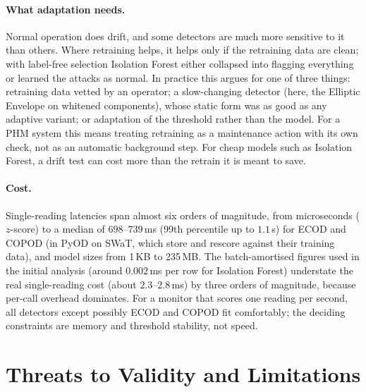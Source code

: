 \documentclass[11pt]{article}
\begin{document}
\paragraph{What adaptation needs.} Normal operation does drift, and some
detectors are much more sensitive to it than others. Where retraining helps, it
helps only if the retraining data are clean; with label-free selection Isolation
Forest either collapsed into flagging everything or learned the attacks as
normal. In practice this argues for one of three things: retraining data vetted
by an operator; a slow-changing detector (here, the Elliptic Envelope on whitened
components), whose static form was as good as any adaptive variant; or adaptation
of the threshold rather than the model. For a PHM system this means treating retraining
as a maintenance action with its own check, not as an automatic background step. For cheap models such as Isolation Forest, a
drift test can cost more than the retrain it is meant to save.

\paragraph{Cost.} Single-reading latencies span almost six orders of magnitude, from
microseconds ($z$-score) to a median of $698$--$739$\,ms (99th percentile up to $1.1$\,s) for
ECOD and COPOD (in PyOD on SWaT, which store and
rescore against their training data), and model sizes from 1\,KB to 235\,MB. The
batch-amortised figures used in the initial analysis (around $0.002$\,ms per row for
Isolation Forest) understate the real single-reading cost (about $2.3$--$2.8$\,ms)
by three orders of magnitude, because per-call overhead dominates. For a monitor that
scores one reading per second, all detectors except possibly ECOD and COPOD fit
comfortably; the deciding constraints are memory and threshold stability, not
speed.

\section{Threats to Validity and Limitations}
\label{sec:limits}
\end{document}
